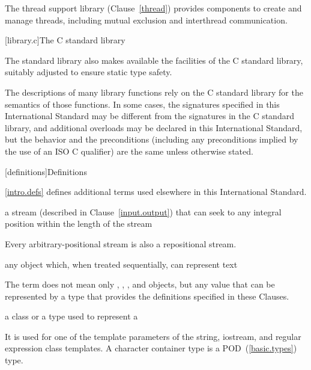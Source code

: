\pnum
The thread support library (Clause~\ref{thread}) provides components to create
and manage threads, including mutual exclusion and interthread communication.

[library.c]{The C standard library}

\pnum
The \Cpp standard library also makes available the facilities of the C standard library,
%
suitably adjusted to ensure static type safety.

\pnum
The descriptions of many library functions rely on the C standard library for
the semantics of those functions.
In some cases,
the signatures specified in this International Standard
may be different from the signatures in the C standard library,
and additional overloads may be declared in this International Standard,
but the behavior and the preconditions
(including any preconditions implied by the use of an
ISO C  qualifier)
are the same unless otherwise stated.

[definitions]{Definitions}

\pnum
\begin{note} \ref{intro.defs} defines additional terms used elsewhere in this International Standard. \end{note}

%
a stream (described in Clause~\ref{input.output}) that can seek to any integral position within
the length of the stream\\
\begin{note} Every arbitrary-positional stream is also a repositional stream. \end{note}

%
any object which,
when treated sequentially,
can represent text\\
\begin{note}
The term does not mean only
,
,
,
and
objects,
but any value that can be represented by a type
that provides the definitions specified in these Clauses.
\end{note}

%
a class or a type used to
represent a
\\
\begin{note}
It is used for one of the template parameters of the string,
iostream, and regular expression class templates.
A character container type is a POD~(\ref{basic.types}) type.
\end{note}

